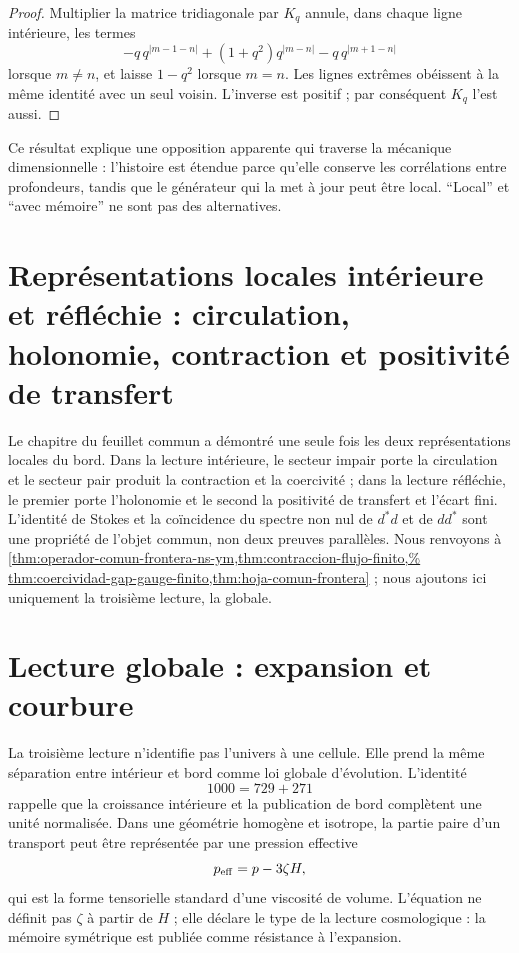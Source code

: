 \begin{proof}
Multiplier la matrice tridiagonale par \(K_q\) annule, dans chaque ligne intérieure,
les termes
\[
 -q\,q^{|m-1-n|}
 +(1+q^2)q^{|m-n|}
 -q\,q^{|m+1-n|}
\]
lorsque \(m\neq n\), et laisse \(1-q^2\) lorsque \(m=n\). Les lignes extrêmes
obéissent à la même identité avec un seul voisin. L'inverse est positif ;
par conséquent \(K_q\) l'est aussi.
\end{proof}

Ce résultat explique une opposition apparente qui traverse la mécanique
dimensionnelle : l'histoire est étendue parce qu'elle conserve les corrélations entre
profondeurs, tandis que le générateur qui la met à jour peut être local.
``Local'' et ``avec mémoire'' ne sont pas des alternatives.

\section{Représentations locales intérieure et réfléchie : circulation, holonomie, contraction et positivité de transfert}

Le chapitre du feuillet commun a démontré une seule fois les deux
représentations locales du bord. Dans la lecture intérieure, le secteur impair
porte la circulation et le secteur pair produit la contraction et la coercivité ; dans la
lecture réfléchie, le premier porte l'holonomie et le second la positivité de
transfert et l'écart fini. L'identité de Stokes et la coïncidence du
spectre non nul de \(d^\ast d\) et de \(dd^\ast\) sont une propriété de l'objet
commun, non deux preuves parallèles. Nous renvoyons à
\cref{thm:operador-comun-frontera-ns-ym,thm:contraccion-flujo-finito,%
thm:coercividad-gap-gauge-finito,thm:hoja-comun-frontera} ; nous ajoutons ici
uniquement la troisième lecture, la globale.

\section{Lecture globale : expansion et courbure}

La troisième lecture n'identifie pas l'univers à une cellule. Elle prend la même
séparation entre intérieur et bord comme loi globale d'évolution.
L'identité
\[
 1000=729+271
\]
rappelle que la croissance intérieure et la publication de bord complètent
une unité normalisée. Dans une géométrie homogène et isotrope, la partie paire
d'un transport peut être représentée par une pression effective
\[
 p_{\rm eff}=p-3\zeta H,
\]
qui est la forme tensorielle standard d'une viscosité de volume. L'équation
ne définit pas \(\zeta\) à partir de \(H\) ; elle déclare le type de la lecture cosmologique :
la mémoire symétrique est publiée comme résistance à l'expansion.

